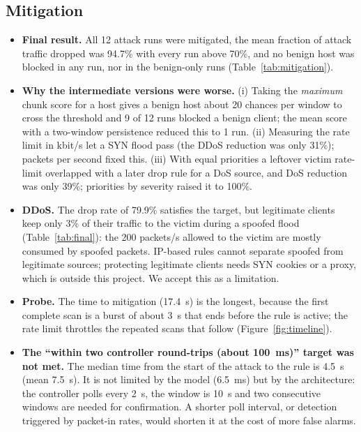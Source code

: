 \subsection{Mitigation}
\begin{itemize}
	\item \textbf{Final result.} All 12 attack runs were mitigated, the mean fraction of attack traffic dropped was 94.7\% with every run above 70\%, and no benign host was blocked in any run, nor in the benign-only runs (Table~\ref{tab:mitigation}).
	\item \textbf{Why the intermediate versions were worse.} (i) Taking the \emph{maximum} chunk score for a host gives a benign host about 20 chances per window to cross the threshold and 9 of 12 runs blocked a benign client; the mean score with a two-window persistence reduced this to 1 run. (ii) Measuring the rate limit in kbit/s let a SYN flood pass (the DDoS reduction was only 31\%); packets per second fixed this. (iii) With equal priorities a leftover victim rate-limit overlapped with a later drop rule for a DoS source, and DoS reduction was only 39\%; priorities by severity raised it to 100\%.
	\item \textbf{DDoS.} The drop rate of 79.9\% satisfies the target, but legitimate clients keep only 3\% of their traffic to the victim during a spoofed flood (Table~\ref{tab:final}): the 200 packets/s allowed to the victim are mostly consumed by spoofed packets. IP-based rules cannot separate spoofed from legitimate sources; protecting legitimate clients needs SYN cookies or a proxy, which is outside this project. We accept this as a limitation.
	\item \textbf{Probe.} The time to mitigation (17.4~s) is the longest, because the first complete scan is a burst of about 3~s that ends before the rule is active; the rate limit throttles the repeated scans that follow (Figure~\ref{fig:timeline}).
	\item \textbf{The ``within two controller round-trips (about 100~ms)'' target was not met.} The median time from the start of the attack to the rule is 4.5~s (mean 7.5~s). It is not limited by the model (6.5~ms) but by the architecture: the controller polls every 2~s, the window is 10~s and two consecutive windows are needed for confirmation. A shorter poll interval, or detection triggered by packet-in rates, would shorten it at the cost of more false alarms.
\end{itemize}

